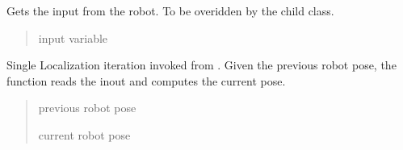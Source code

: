 \documentclass[letterpaper,10pt,english]{sphinxmanual}
\begin{document}
\begin{fulllineitems}
\begin{fulllineitems}
\begin{quote}
\begin{description}
\begin{itemize}
\end{itemize}

\end{description}\end{quote}

\end{fulllineitems}


\begin{fulllineitems}
\label{\detokenize{Localization:Localization.Localization.GetInput}}
\pysigstartsignatures
{}
\pysigstopsignatures
\sphinxAtStartPar
Gets the input from the robot. To be overidden by the child class.
\begin{quote}\begin{description}
\sphinxAtStartPar
input variable

\end{description}\end{quote}

\end{fulllineitems}


\begin{fulllineitems}
\label{\detokenize{Localization:Localization.Localization.Localize}}
\pysigstartsignatures
{}
\pysigstopsignatures
\sphinxAtStartPar
Single Localization iteration invoked from . Given the previous robot pose, the function reads the inout and computes the current pose.
\begin{quote}\begin{description}
\sphinxAtStartPar
{} \textendash{} previous robot pose

\sphinxAtStartPar
current robot pose

\end{description}\end{quote}

\end{fulllineitems}


\end{fulllineitems}
\end{document}
